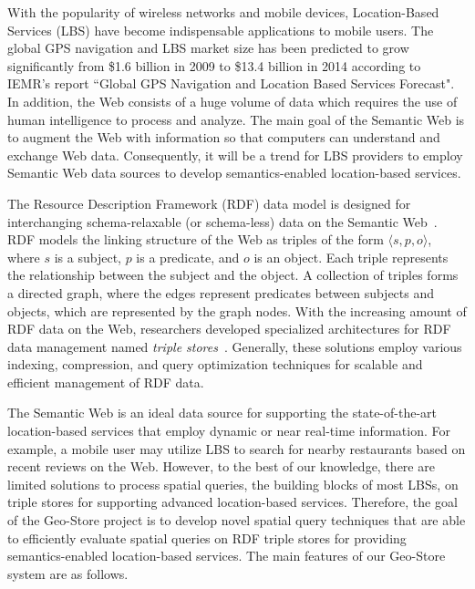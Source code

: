 
With the popularity of wireless networks and mobile devices,
Location-Based Services (LBS) have become indispensable
applications to mobile users. The global GPS navigation and LBS
market size has been predicted to grow significantly from \$1.6
billion in 2009 to \$13.4 billion in 2014 according to IEMR's
report ``Global GPS Navigation and Location Based Services
Forecast". In addition, the Web consists of a huge volume of data
which requires the use of human intelligence to process and analyze. The main goal of the
Semantic Web is to augment the Web with information so that
computers can understand and exchange Web data. Consequently, it
will be a trend for LBS providers to employ Semantic Web data
sources to develop semantics-enabled location-based services.

The Resource Description Framework (RDF) data model is designed
for interchanging schema-relaxable (or schema-less) data on the
Semantic Web~\cite{RDF}. RDF models the linking structure of the
Web as triples of the form $\langle s, p, o \rangle$, where $s$ is
a subject, $p$ is a predicate, and $o$ is an object. Each triple
represents the relationship between the subject and the object. A
collection of triples forms a directed graph, where the edges
represent predicates between subjects and objects, which are
represented by the graph nodes. With the increasing amount of RDF
data on the Web, researchers developed specialized architectures
for RDF data management named \emph{triple
stores}~\cite{conf/www/CarrollDDRSW04,conf/vldb/ChongDES05,conf/vldb/AbadiMMH07,
journals/pvldb/WeissKB08,journals/vldb/NeumannW10}. Generally,
these solutions employ various indexing, compression, and query
optimization techniques for scalable and efficient management of
RDF data.

The Semantic Web is an ideal data source for supporting the
state-of-the-art location-based services that employ dynamic or
near real-time information. For example, a mobile user may utilize
LBS to search for nearby restaurants based on recent reviews on
the Web. However, to the best of our knowledge, there are limited
solutions to process spatial queries, the building blocks of most
LBSs, on triple stores for supporting advanced location-based
services. Therefore, the goal of the Geo-Store project is to
develop novel spatial query techniques that are able to
efficiently evaluate spatial queries on RDF triple stores for
providing semantics-enabled location-based services. The main
features of our Geo-Store system are as follows.

